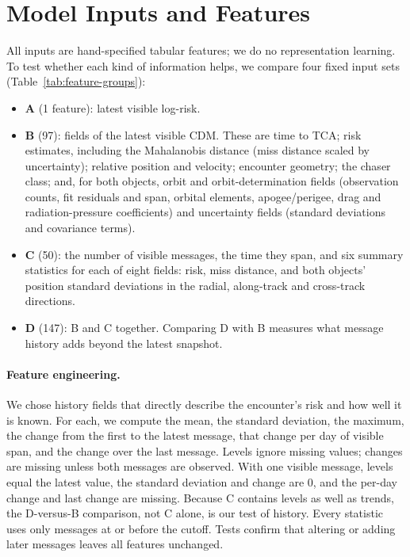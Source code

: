 \section{Model Inputs and Features}
\label{sec:features}

All inputs are hand-specified tabular features; we do no representation learning. To test whether each kind of information helps, we compare four fixed input sets (Table~\ref{tab:feature-groups}):
\begin{itemize}
\item \textbf{A} (1 feature): latest visible log-risk.
\item \textbf{B} (97): fields of the latest visible CDM. These are time to TCA; risk estimates, including the Mahalanobis distance (miss distance scaled by uncertainty); relative position and velocity; encounter geometry; the chaser class; and, for both objects, orbit and orbit-determination fields (observation counts, fit residuals and span, orbital elements, apogee/perigee, drag and radiation-pressure coefficients) and uncertainty fields (standard deviations and covariance terms).
\item \textbf{C} (50): the number of visible messages, the time they span, and six summary statistics for each of eight fields: risk, miss distance, and both objects' position standard deviations in the radial, along-track and cross-track directions.
\item \textbf{D} (147): B and C together. Comparing D with B measures what message history adds beyond the latest snapshot.
\end{itemize}

\paragraph{Feature engineering.} We chose history fields that directly describe the encounter's risk and how well it is known. For each, we compute the mean, the standard deviation, the maximum, the change from the first to the latest message, that change per day of visible span, and the change over the last message. Levels ignore missing values; changes are missing unless both messages are observed. With one visible message, levels equal the latest value, the standard deviation and change are 0, and the per-day change and last change are missing. Because C contains levels as well as trends, the D-versus-B comparison, not C alone, is our test of history. Every statistic uses only messages at or before the cutoff. Tests confirm that altering or adding later messages leaves all features unchanged.

